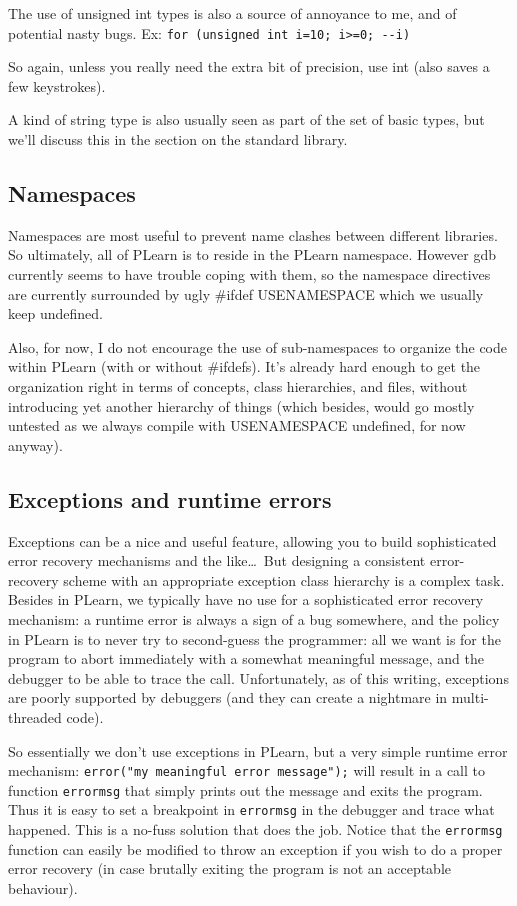 \documentclass[11pt]{book}
\begin{document}
 The use of unsigned int types is also a source of annoyance to me,
and of potential nasty bugs. Ex:
\verb!for (unsigned int i=10; i>=0; --i)!

So again, unless you really need the extra bit of precision,
use int (also saves a few keystrokes).

 A kind of string type is also usually seen as part of the set of basic
types, but we'll discuss this in the section on the standard library.

\subsection*{Namespaces}
 Namespaces are most useful to prevent name clashes between different
libraries. So ultimately, all of PLearn is to reside in the PLearn
namespace. However gdb currently seems to have trouble coping with
them, so the namespace directives are currently surrounded by ugly
\#ifdef USENAMESPACE which we usually keep undefined.

 Also, for now, I do not encourage the use of sub-namespaces to
organize the code within PLearn (with or without \#ifdefs). It's
already hard enough to get the organization right in terms of
concepts, class hierarchies, and files, without introducing yet
another hierarchy of things (which besides, would go mostly untested
as we always compile with USENAMESPACE undefined, for now anyway).

\subsection*{Exceptions and runtime errors}
 Exceptions can be a nice and useful feature, allowing you to build
sophisticated error recovery mechanisms and the like\ldots\ But
designing a consistent error-recovery scheme with an appropriate
exception class hierarchy is a complex task. Besides in PLearn, we
typically have no use for a sophisticated error recovery mechanism:
a runtime error is always a sign of a bug somewhere, and the policy
in PLearn is to never try to second-guess the programmer: all we want
is for the program to abort immediately with a somewhat meaningful
message, and the debugger to be able to trace the call. Unfortunately,
as of this writing, exceptions are poorly supported by debuggers
(and they can create a nightmare in multi-threaded code).

 So essentially we don't use exceptions in PLearn, but a very simple
runtime error mechanism: \texttt{error("my meaningful error message");}
will result in a call to function {\tt errormsg} that simply prints out
the message and exits the program. Thus it is easy to set a breakpoint
in {\tt errormsg} in the debugger and trace what happened. This is
a no-fuss solution that does the job. Notice that the {\tt errormsg}
function can easily be modified to throw an exception if you wish to
do a proper error recovery (in case brutally exiting the program is
not an acceptable behaviour).
\end{document}
